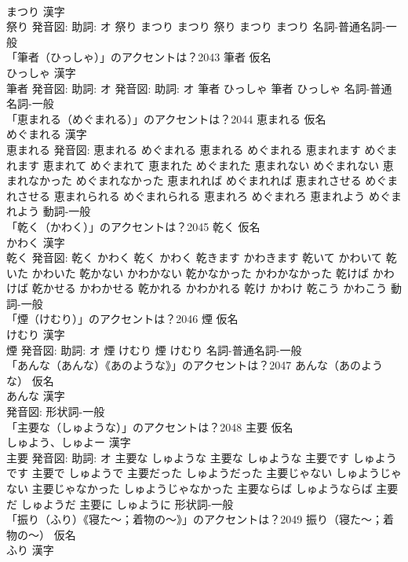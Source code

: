 \documentclass[8pt]{extreport}
\begin{document}
\begin{CJK}{UTF8}{min}
\\	まつり 漢字　
\\	祭り 発音図: 助詞: オ	祭り まつり まつり		祭り まつり まつり				名詞-普通名詞-一般 
\\	「筆者（ひっしゃ）」のアクセントは？2043	筆者 仮名　
\\	ひっしゃ 漢字　
\\	筆者 発音図: 助詞: オ 発音図: 助詞: オ	筆者 ひっしゃ		筆者 ひっしゃ				名詞-普通名詞-一般 
\\	「恵まれる（めぐまれる）」のアクセントは？2044	恵まれる 仮名　
\\	めぐまれる 漢字　
\\	恵まれる 発音図:	恵まれる めぐまれる		恵まれる めぐまれる 恵まれます めぐまれます 恵まれて めぐまれて 恵まれた めぐまれた 恵まれない めぐまれない 恵まれなかった めぐまれなかった 恵まれれば めぐまれれば 恵まれさせる めぐまれさせる 恵まれられる めぐまれられる 恵まれろ めぐまれろ 恵まれよう めぐまれよう				動詞-一般 
\\	「乾く（かわく）」のアクセントは？2045	乾く 仮名　
\\	かわく 漢字　
\\	乾く 発音図:	乾く かわく		乾く かわく 乾きます かわきます 乾いて かわいて 乾いた かわいた 乾かない かわかない 乾かなかった かわかなかった 乾けば かわけば 乾かせる かわかせる 乾かれる かわかれる 乾け かわけ 乾こう かわこう				動詞-一般 
\\	「煙（けむり）」のアクセントは？2046	煙 仮名　
\\	けむり 漢字　
\\	煙 発音図: 助詞: オ	煙 けむり		煙 けむり				名詞-普通名詞-一般 
\\	「あんな（あんな）《あのような》」のアクセントは？2047	あんな（あのような） 仮名　
\\	あんな 漢字　
\\	発音図:							形状詞-一般 
\\	「主要な（しゅような）」のアクセントは？2048	主要 仮名　
\\	しゅよう、しゅよー 漢字　
\\	主要 発音図: 助詞: オ	主要な しゅような		主要な しゅような 主要です しゅようです 主要で しゅようで 主要だった しゅようだった 主要じゃない しゅようじゃない 主要じゃなかった しゅようじゃなかった 主要ならば しゅようならば 主要だ しゅようだ 主要に しゅように				形状詞-一般 
\\	「振り（ふり）《寝た〜；着物の〜》」のアクセントは？2049	振り（寝た〜；着物の〜） 仮名　
\\	ふり 漢字　

\end{CJK}
\end{document}
